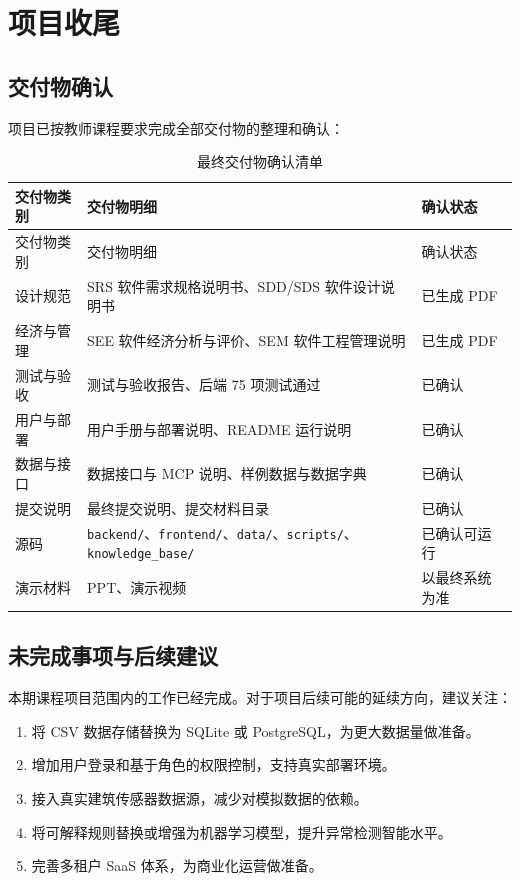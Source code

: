 \documentclass[12pt,a4paper]{ctexart}
\newcommand{\code}[1]{{\footnotesize\nolinkurl{#1}}}
\begin{document}
\section{项目收尾}

\subsection{交付物确认}

项目已按教师课程要求完成全部交付物的整理和确认：

\begin{longtable}{L{3.0cm}L{5.0cm}L{5.5cm}}
\caption{最终交付物确认清单}\\
\toprule
交付物类别 & 交付物明细 & 确认状态 \\
\midrule
\endfirsthead
\toprule
交付物类别 & 交付物明细 & 确认状态 \\
\midrule
\endhead
设计规范 & SRS 软件需求规格说明书、SDD/SDS 软件设计说明书 & 已生成 PDF \\
经济与管理 & SEE 软件经济分析与评价、SEM 软件工程管理说明 & 已生成 PDF \\
测试与验收 & 测试与验收报告、后端 75 项测试通过 & 已确认 \\
用户与部署 & 用户手册与部署说明、README 运行说明 & 已确认 \\
数据与接口 & 数据接口与 MCP 说明、样例数据与数据字典 & 已确认 \\
提交说明 & 最终提交说明、提交材料目录 & 已确认 \\
源码 & \code{backend/}、\code{frontend/}、\code{data/}、\code{scripts/}、\code{knowledge\_base/} & 已确认可运行 \\
演示材料 & PPT、演示视频 & 以最终系统为准 \\
\bottomrule
\end{longtable}

\subsection{未完成事项与后续建议}

本期课程项目范围内的工作已经完成。对于项目后续可能的延续方向，建议关注：
\begin{enumerate}
    \item 将 CSV 数据存储替换为 SQLite 或 PostgreSQL，为更大数据量做准备。
    \item 增加用户登录和基于角色的权限控制，支持真实部署环境。
    \item 接入真实建筑传感器数据源，减少对模拟数据的依赖。
    \item 将可解释规则替换或增强为机器学习模型，提升异常检测智能水平。
    \item 完善多租户 SaaS 体系，为商业化运营做准备。
\end{enumerate}
\end{document}
